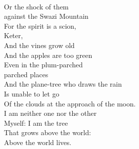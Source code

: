 \documentclass[smalldemyvopaper,11pt,twoside,onecolumn,openright,extrafontsizes]{memoir}
\begin{document}
\\Or the shock of them
\\against the Swazi Mountain
\\For the spirit is a scion,
\\Keter,
\\And the vines grow old
\\And the apples are too green
\\Even in the plum-parched
\\parched places
\\And the plane-tree who draws the rain
\\Is unable to let go
\\Of the clouds at the approach of the moon.
\\I am neither one nor the other
\\Myself: I am the tree
\\That grows above the world:
\\Above the world lives.
\end{document}
